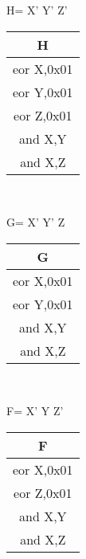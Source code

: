 \documentclass[journal,12pt,twocolumn]{IEEEtran}
\begin{document}
 \begin{center}
     H= X' Y' Z'
            \begin{table}[h]
                \centering
                \begin{tabular}{|c|}
                \hline
                H \\
                \hline
                     eor X,0x01\\
                     eor Y,0x01\\
                     eor Z,0x01\\
                     and X,Y\\
                     and X,Z\\
                     \hline
                \end{tabular}
            \end{table}\\ 
 \end{center}
  \begin{center}
      G= X' Y' Z
       \begin{table}[h]
                \centering
                \begin{tabular}{|c|}
                \hline
                G \\
                \hline
                     eor X,0x01\\
                     eor Y,0x01\\
                     
                     and X,Y\\
                     and X,Z\\
                     \hline
                \end{tabular}
            \end{table}\\ 
 \end{center}
  \begin{center}
      F= X' Y Z'
      \begin{table}[h]
                \centering
                \begin{tabular}{|c|}
                \hline
                F \\
                \hline
                     eor X,0x01\\
                     eor Z,0x01\\
                     
                     and X,Y\\
                     and X,Z\\
                     \hline
                \end{tabular}
        \end{table}\\ 
 \end{center}
\end{document}
